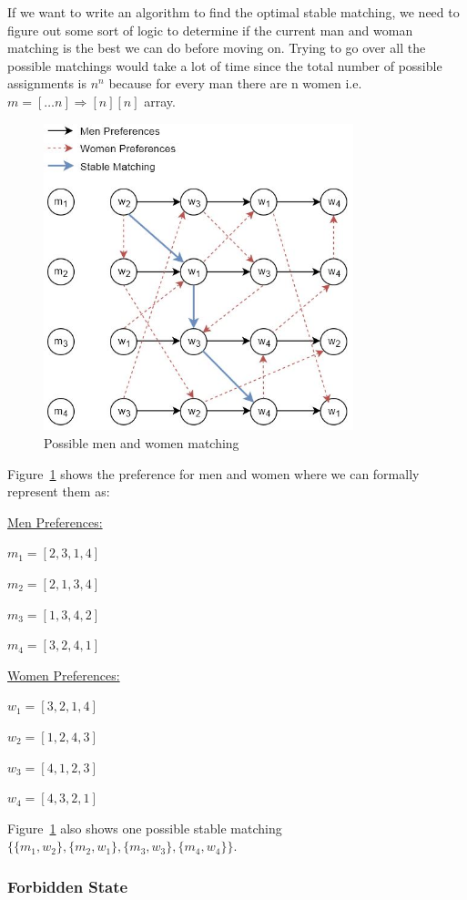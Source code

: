 \documentclass[twoside]{article}
\begin{document}
If we want to write an algorithm to find the optimal stable matching, we need to figure out some sort of logic to determine if the current man and woman matching is the best we can do before moving on. Trying to go over all the possible matchings would take a lot of time since the total number of possible assignments is $n^n$ because for every man there are n women i.e. $ m = [ \ldots n] \Longrightarrow [n][n]$ array.

\begin{figure}[htp]
\centering
\includegraphics[width=9cm]{PossibleStableMatchings.JPG}
\caption{Possible men and women matching}
\label{fig:PossibleStableMatchings}
\end{figure}

Figure~\ref{fig:PossibleStableMatchings} shows the preference for men and women where we can formally represent them as:

\underline{Men Preferences:}

$m_1 = [2, 3, 1, 4]$

$m_2 = [2, 1, 3, 4]$

$m_3 = [1, 3, 4, 2]$

$m_4 = [3, 2, 4, 1]$

\underline{Women Preferences:}

$w_1 = [3, 2, 1, 4]$

$w_2 = [1, 2, 4, 3]$

$w_3 = [4, 1, 2, 3]$

$w_4 = [4, 3, 2, 1]$

Figure~\ref{fig:PossibleStableMatchings} also shows one possible stable matching $\{\{m_1, w_2\}, \{m_2, w_1\}, \{m_3, w_3\}, \{m_4, w_4\}\}$.

\subsubsection{Forbidden State}
\end{document}
